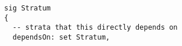 \lstset{frame=tb, aboveskip=12pt, belowskip=-3pt, breaklines=true, basicstyle=\small\ttfamily, tabsize=2, mathescape=true}
\begin{lstlisting}[caption={structure.als, lines 19-22}, label=alloy:savcbs-stratum-V, captionpos=b]
sig Stratum
{
  -- strata that this directly depends on
  dependsOn: set Stratum,
\end{lstlisting}
